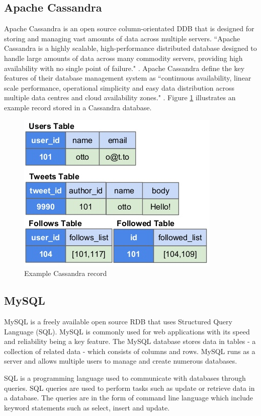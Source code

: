 \subsection{Apache Cassandra}\label{cassandra}
Apache Cassandra is an open source column-orientated DDB that is designed for storing and managing vast amounts of data across multiple servers. ``Apache Cassandra is a highly scalable, high-performance distributed database designed to handle large amounts of data across many commodity servers, providing high availability with no single point of failure." \cite{cassandra}. Apache Cassandra define the key features of their database management system as ``continuous availability, linear scale performance, operational simplicity and easy data distribution across multiple data centres and cloud availability zones." \cite{cassandra}.  Figure \ref{fig:cass} illustrates an example record stored in a Cassandra database. \begin{figure}[h]\begin{center}\includegraphics[width=0.70\linewidth]{images/cassandramodel}\caption{Example Cassandra record}\label{fig:cass}\end{center}\end{figure}

\subsection{MySQL}\label{mysql}
MySQL is a freely available open source RDB that uses Structured Query Language (SQL). MySQL is commonly used for web applications with its speed and reliability being a key feature. The MySQL database stores data in tables - a collection of related data - which consists of columns and rows. MySQL runs as a server and allows multiple users to manage and create numerous databases. 

SQL is a programming language used to communicate with databases through queries. SQL queries are used to perform tasks such as update or retrieve data in a database. The queries are in the form of command line language which include keyword statements such as select, insert and update.